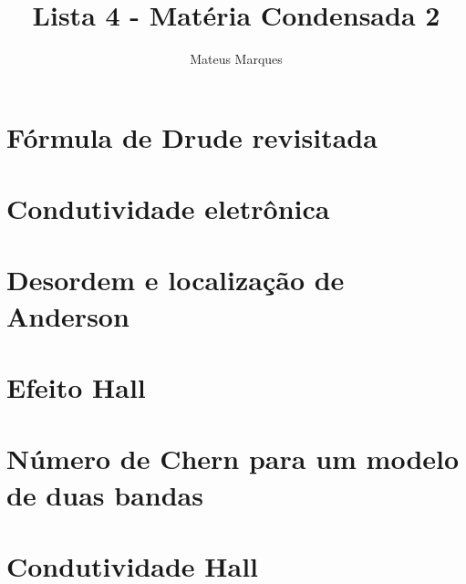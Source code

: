 \documentclass[a4paper,10pt]{article}
\title{\Huge{\textbf{Lista 4 - Matéria Condensada 2}}}
\author{Mateus Marques}
\begin{document}
\maketitle

\section{Fórmula de Drude revisitada}


\pagebreak

\section{Condutividade eletrônica}

\pagebreak

\section{Desordem e localização de Anderson}

\pagebreak

\section{Efeito Hall}

\pagebreak

\section{Número de Chern para um modelo de duas bandas}

\pagebreak

\section{Condutividade Hall}


\pagebreak
\end{document}
